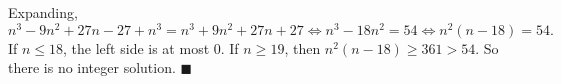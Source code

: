 Expanding,
\[
n^3-9n^2+27n-27+n^3=n^3+9n^2+27n+27\iff n^3-18n^2=54\iff n^2(n-18)=54 .
\]
If $n\le18$, the left side is at most $0$. If $n\ge19$, then $n^2(n-18)\ge361>54$. So there is no integer solution. $\blacksquare$
